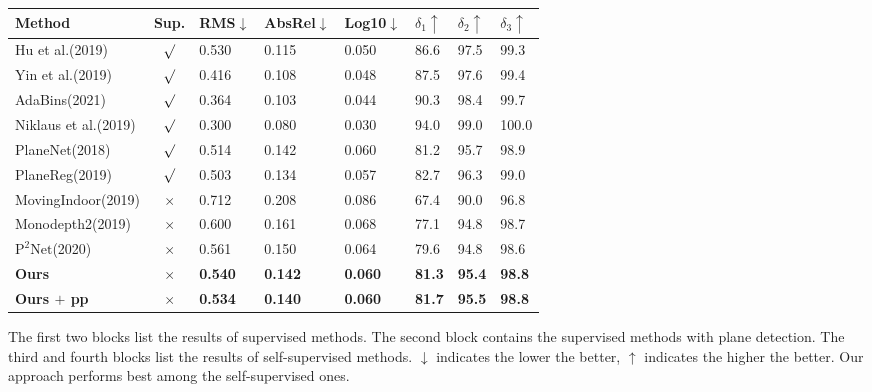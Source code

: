 \documentclass[10pt,twocolumn,letterpaper]{article}
\begin{document}
\begin{table*}[ht]
	\centering
	\begin{varwidth}[t]{\textwidth}
\vspace{0pt}
		\small
		\begin{tabularx}{0.67\textwidth}{|l|c|XXX|XXX|}
			\hline
			Method & Sup. & RMS$\downarrow$ & AbsRel$\downarrow$ & Log10$\downarrow$ & $\delta_1\uparrow$ & $\delta_2\uparrow$ & $\delta_3\uparrow$ \\
			\hline
Hu et al.(2019)\cite{hu2019revisiting} & $\surd$     & 0.530  & 0.115 & 0.050  & 86.6  & 97.5  & 99.3 \\
			Yin et al.(2019)\cite{yin2019enforcing}& $\surd$     & 0.416  & 0.108 & 0.048  & 87.5  & 97.6  & 99.4 \\
			AdaBins(2021)\cite{bhat2021adabins} & $\surd$        & 0.364  & 0.103 & 0.044  & 90.3  & 98.4  & 99.7 \\
			Niklaus et al.(2019)\cite{niklaus20193d} & $\surd$   & 0.300  & 0.080 & 0.030  & 94.0  & 99.0  & 100.0 \\
			\hline
			PlaneNet(2018)\cite{liu2018planenet} & $\surd$    & 0.514 & 0.142 & 0.060  & 81.2  & 95.7  & 98.9 \\
			PlaneReg(2019)\cite{yu2019single} & $\surd$    & 0.503 & 0.134 & 0.057 & 82.7  & 96.3  & 99.0 \\
			\hline
			MovingIndoor(2019)\cite{zhou2019moving} & $\times$     & 0.712 & 0.208 & 0.086 & 67.4  & 90.0    & 96.8 \\
Monodepth2(2019)\cite{godard2019digging}   & $\times$    & 0.600 & 0.161  & 0.068 & 77.1  & 94.8  & 98.7 \\
			$\mathrm{P}^{2}\mathrm{Net}$(2020)\cite{yu2020p} & $\times$     & 0.561 & 0.150  & 0.064 & 79.6  & 94.8  & 98.6 \\
\textbf{Ours}   & $\times$    & \textbf{0.540} & \textbf{0.142} & 
			\textbf{0.060} & \textbf{81.3}  & \textbf{95.4}  & \textbf{98.8} \\
			
\textbf{Ours $+$ pp} & $\times$     & \textbf{0.534} & \textbf{0.140} & \textbf{0.060} & \textbf{81.7} & \textbf{95.5} & \textbf{98.8} \\
			\hline
\end{tabularx}
	\end{varwidth}
	\quad
	\begin{varwidth}[t]{\textwidth}
\vspace{0pt}
		\parbox[b]{0.30\textwidth}{
			\small
			The first two blocks list the results of supervised methods. The second block contains the supervised methods with plane detection. The third and fourth blocks list the results of self-supervised methods. $\downarrow$ indicates the lower the better, $\uparrow$ indicates the higher the better. Our approach performs best among the self-supervised ones.\\
			
}
\end{varwidth}
\end{table*}
\end{document}
